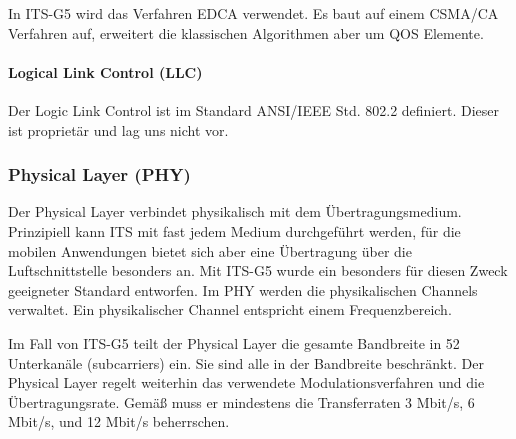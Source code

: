 In \ac{ITS-G5} wird das Verfahren \ac{EDCA} verwendet. Es baut auf einem CSMA/CA Verfahren auf, erweitert die klassischen Algorithmen aber um \ac{QOS} Elemente. 

\paragraph{Logical Link Control (LLC)}
Der Logic Link Control ist im Standard ANSI/IEEE Std. 802.2 definiert. Dieser ist  proprietär und lag uns nicht vor.

\subsubsection{Physical Layer (PHY)}
Der Physical Layer verbindet physikalisch mit dem Übertragungsmedium. Prinzipiell kann \ac{ITS} mit fast jedem Medium durchgeführt werden, für die mobilen Anwendungen bietet sich aber eine Übertragung über die Luftschnittstelle besonders an. Mit  \ac{ITS-G5} wurde ein besonders für diesen Zweck geeigneter Standard entworfen. Im PHY werden die physikalischen Channels verwaltet. Ein physikalischer Channel entspricht einem Frequenzbereich. 

Im Fall von \ac{ITS-G5} teilt der Physical Layer die gesamte Bandbreite in 52 Unterkanäle (subcarriers) ein. Sie sind alle in der Bandbreite beschränkt. Der Physical Layer regelt weiterhin das verwendete Modulationsverfahren und die Übertragungsrate. Gemäß \cite{en302663} muss er mindestens die Transferraten 3 Mbit/s, 6 Mbit/s, und 12 Mbit/s beherrschen. 
 
